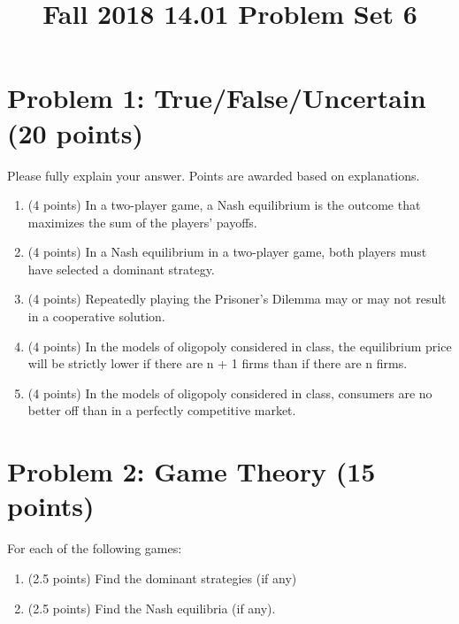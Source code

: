 \documentclass{article}
\title{Fall 2018 14.01 Problem Set 6}
\date{}
\begin{document}
\maketitle

\section*{Problem 1: True/False/Uncertain (20 points)}
Please fully explain your answer. Points are awarded based on explanations.
\begin{enumerate}
\item (4 points) In a two-player game, a Nash equilibrium is the outcome that maximizes the sum of the players’ payoﬀs.
\item (4 points) In a Nash equilibrium in a two-player game, both players must have selected a dominant strategy.
\item (4 points) Repeatedly playing the Prisoner’s Dilemma may or may not result in a cooperative solution.
\item (4 points) In the models of oligopoly considered in class, the equilibrium price will be strictly lower if there are n + 1 ﬁrms than if there are n ﬁrms.
\item (4 points) In the models of oligopoly considered in class, consumers are no better oﬀ than in a perfectly competitive market. 
\end{enumerate}

\section*{Problem 2: Game Theory (15 points)}
For each of the following games:
\begin{enumerate}[label=(\roman*)]
\item (2.5 points) Find the dominant strategies (if any)
\item (2.5 points) Find the Nash equilibria (if any). 
\end{enumerate}

\end{document}
